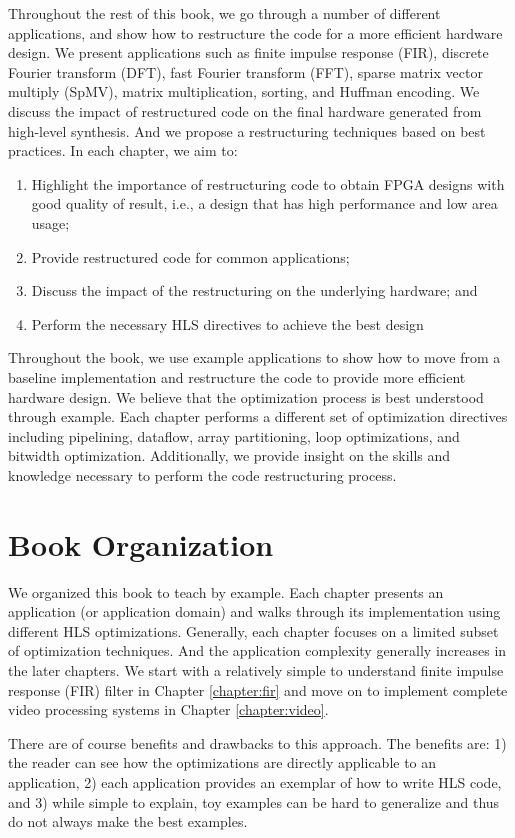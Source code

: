 Throughout the rest of this book, we go through a number of different applications, and show how to restructure the code for a more efficient hardware design. We present applications such as finite impulse response (FIR), discrete Fourier transform (DFT), fast Fourier transform (FFT), sparse matrix vector multiply (SpMV), matrix multiplication, sorting, and Huffman encoding. We discuss the impact of restructured code on the final hardware generated from high-level synthesis. And we propose a restructuring techniques based on best practices. In each chapter, we aim to:
\begin{enumerate}
	\item Highlight the importance of restructuring code to obtain FPGA
          designs with good quality of result, i.e., a design that has high performance and low area usage;
	\item Provide restructured code for common applications;
	\item Discuss the impact of the restructuring on the underlying hardware; and
	\item Perform the necessary HLS directives to achieve the best design
\end{enumerate}
Throughout the book, we use example applications to show how to move from a baseline implementation and restructure the code to provide more efficient hardware design. We believe that the optimization process is best understood through example. Each chapter performs a different set of optimization directives including pipelining, dataflow, array partitioning, loop optimizations, and bitwidth optimization.  Additionally, we provide insight on the skills and knowledge necessary to perform the code restructuring process.

\section{Book Organization}
We organized this book to teach by example. Each chapter presents an application (or application domain) and walks through its implementation using  different HLS optimizations. Generally, each chapter focuses on a limited subset of optimization techniques. And the application complexity generally increases in the later chapters. We start with a relatively simple to understand finite impulse response (FIR) filter in Chapter \ref{chapter:fir} and move on to implement complete video processing systems in Chapter \ref{chapter:video}. 

There are of course benefits and drawbacks to this approach. The benefits are: 1) the reader can see how the optimizations are directly applicable to an application, 2) each application provides an exemplar of how to write HLS code, and 3) while simple to explain, toy examples can be hard to generalize and thus do not always make the best examples. 

